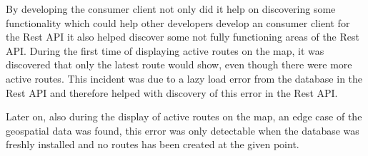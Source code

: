\bigskip
By developing the consumer client not only did it help on discovering some functionality which could help other developers develop an consumer client for the Rest API it also helped discover some not fully functioning areas of the Rest API.
During the first time of displaying active routes on the map, it was discovered that only the latest route would show, even though there were more active routes.
This incident was due to a lazy load error from the database in the Rest API and therefore helped with discovery of this error in the Rest API.

Later on, also during the display of active routes on the map, an edge case of the geospatial data was found, this error was only detectable when the database was freshly installed and no routes has been created at the given point.
